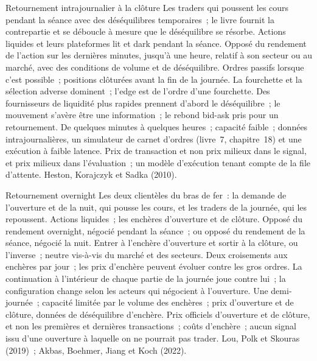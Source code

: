 \begin{strategyfile}{Retournement intrajournalier à la clôture}\label{strat:s1:short-term-reversal:intraday}
 Les traders qui poussent les cours pendant la séance avec des déséquilibres temporaires~; le livre fournit la contrepartie et se déboucle à mesure que le
déséquilibre se résorbe.
 Actions liquides et leurs plateformes lit et dark pendant la séance.
 Opposé du rendement de l'action sur les dernières minutes, jusqu'à une heure, relatif à son secteur ou au marché, avec des conditions de volume et de déséquilibre.
 Ordres passifs lorsque c'est possible~; positions clôturées avant la fin de la journée.
 La fourchette et la sélection adverse dominent~; l'edge est de l'ordre d'une fourchette.
 Des fournisseurs de liquidité plus rapides prennent d'abord le déséquilibre~; le mouvement s'avère être une information~; le rebond bid-ask pris pour un retournement.
 De quelques minutes à quelques heures~; capacité faible~; données intrajournalières, un simulateur de carnet d'ordres (livre~7, chapitre~18) et une exécution à faible
latence.
 Prix de transaction et non prix milieux dans le signal, et prix milieux dans l'évaluation~; un modèle d'exécution tenant compte de la file d'attente.
 Heston, Korajczyk et Sadka (2010).
\end{strategyfile}

\begin{strategyfile}{Retournement overnight}\label{strat:s1:short-term-reversal:overnight}
 Les deux clientèles du bras de fer~: la demande de l'ouverture et de la nuit, qui pousse les cours, et les traders de la journée, qui les repoussent.
 Actions liquides~; les enchères d'ouverture et de clôture.
 Opposé du rendement overnight, négocié pendant la séance~; ou opposé du rendement de la séance, négocié la nuit.
 Entrer à l'enchère d'ouverture et sortir à la clôture, ou l'inverse~; neutre vis-à-vis du marché et des secteurs.
 Deux croisements aux enchères par jour~; les prix d'enchère peuvent évoluer contre les gros ordres.
 La continuation à l'intérieur de chaque partie de la journée joue contre lui~; la configuration change selon les acteurs qui négocient à l'ouverture.
 Une demi-journée~; capacité limitée par le volume des enchères~; prix d'ouverture et de clôture, données de déséquilibre d'enchère.
 Prix officiels d'ouverture et de clôture, et non les premières et dernières transactions~; coûts d'enchère~; aucun signal issu d'une ouverture à laquelle on ne pourrait pas trader.
 Lou, Polk et Skouras (2019)~; Akbas, Boehmer, Jiang et Koch (2022).
\end{strategyfile}

